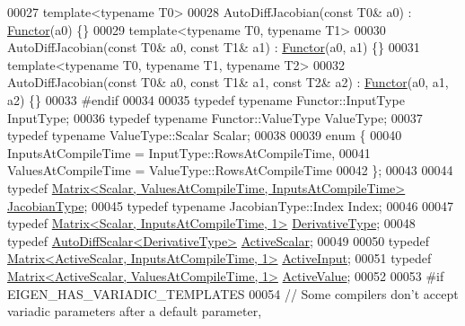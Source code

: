 \begin{DoxyCode}
00027   \textcolor{keyword}{template}<\textcolor{keyword}{typename} T0>
00028   AutoDiffJacobian(\textcolor{keyword}{const} T0& a0) : \hyperlink{struct_functor}{Functor}(a0) \{\}
00029   \textcolor{keyword}{template}<\textcolor{keyword}{typename} T0, \textcolor{keyword}{typename} T1>
00030   AutoDiffJacobian(\textcolor{keyword}{const} T0& a0, \textcolor{keyword}{const} T1& a1) : \hyperlink{struct_functor}{Functor}(a0, a1) \{\}
00031   \textcolor{keyword}{template}<\textcolor{keyword}{typename} T0, \textcolor{keyword}{typename} T1, \textcolor{keyword}{typename} T2>
00032   AutoDiffJacobian(\textcolor{keyword}{const} T0& a0, \textcolor{keyword}{const} T1& a1, \textcolor{keyword}{const} T2& a2) : \hyperlink{struct_functor}{Functor}(a0, a1, a2) \{\}
00033 \textcolor{preprocessor}{#endif}
00034 
00035   \textcolor{keyword}{typedef} \textcolor{keyword}{typename} Functor::InputType InputType;
00036   \textcolor{keyword}{typedef} \textcolor{keyword}{typename} Functor::ValueType ValueType;
00037   \textcolor{keyword}{typedef} \textcolor{keyword}{typename} ValueType::Scalar Scalar;
00038 
00039   \textcolor{keyword}{enum} \{
00040     InputsAtCompileTime = InputType::RowsAtCompileTime,
00041     ValuesAtCompileTime = ValueType::RowsAtCompileTime
00042   \};
00043 
00044   \textcolor{keyword}{typedef} \hyperlink{group___core___module_class_eigen_1_1_matrix}{Matrix<Scalar, ValuesAtCompileTime, InputsAtCompileTime>}
       \hyperlink{group___core___module_class_eigen_1_1_matrix}{JacobianType};
00045   \textcolor{keyword}{typedef} \textcolor{keyword}{typename} JacobianType::Index Index;
00046 
00047   \textcolor{keyword}{typedef} \hyperlink{group___core___module_class_eigen_1_1_matrix}{Matrix<Scalar, InputsAtCompileTime, 1>} 
      \hyperlink{group___core___module_class_eigen_1_1_matrix}{DerivativeType};
00048   \textcolor{keyword}{typedef} \hyperlink{class_eigen_1_1_auto_diff_scalar}{AutoDiffScalar<DerivativeType>} 
      \hyperlink{class_eigen_1_1_auto_diff_scalar}{ActiveScalar};
00049 
00050   \textcolor{keyword}{typedef} \hyperlink{group___core___module_class_eigen_1_1_matrix}{Matrix<ActiveScalar, InputsAtCompileTime, 1>} 
      \hyperlink{group___core___module_class_eigen_1_1_matrix}{ActiveInput};
00051   \textcolor{keyword}{typedef} \hyperlink{group___core___module_class_eigen_1_1_matrix}{Matrix<ActiveScalar, ValuesAtCompileTime, 1>} 
      \hyperlink{group___core___module_class_eigen_1_1_matrix}{ActiveValue};
00052 
00053 \textcolor{preprocessor}{#if EIGEN\_HAS\_VARIADIC\_TEMPLATES}
00054   \textcolor{comment}{// Some compilers don't accept variadic parameters after a default parameter,}

\end{DoxyCode}
